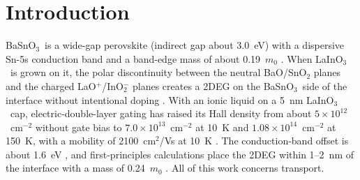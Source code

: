 \documentclass[11pt]{article}
\newcommand{\LIO}{\texorpdfstring{LaInO$_3$}{LaInO3}}
\newcommand{\BSO}{\texorpdfstring{BaSnO$_3$}{BaSnO3}}
\begin{document}
\begin{abstract}
With all positive charge at the interface the Fermi level reaches the \LIO\ conduction band near $1.1\times10^{14}$~cm$^{-2}$ (compensated). If the gate charge sits instead on the surface of a 5~nm \LIO\ cap, as in electrolyte gating, cap states start to fill after only $2.0$--$3.1\times10^{13}$~cm$^{-2}$ of added density, so that purely electrostatic gating through such a cap stays far below the measured $0.7$--$1.1\times10^{14}$~cm$^{-2}$; in this model they require most of the added positive charge to sit close to the interface, or a larger band offset. With three polar LO modes (Fr\"ohlich constants summing to 1.3), the $2\to1$ lifetime of electrons excited from subband 1 is 32--79~fs. The asymmetric well has an intrinsic second-order susceptibility; for a 30~meV linewidth Coulomb screening reduces it by factors of 2--9, to 37--139~nm$^2$/V per interface. Over the literature ranges of seven material parameters, the acceptor density dominates the uncertainty of $E_{21}$, the collective absorption is about twice as robust, and at $10^{14}$~cm$^{-2}$ the Fermi level lies within 0.2~eV of the cap conduction band in 82\% of the parameter sets.
\end{abstract}

\section{Introduction}
\BSO\ is a wide-gap perovskite (indirect gap about 3.0~eV) with a dispersive Sn-5s conduction band and a band-edge mass of about 0.19~$m_0$ \cite{Niedermeier2017,Aggoune2022}. When \LIO\ is grown on it, the polar discontinuity between the neutral BaO/SnO$_2$ planes and the charged LaO$^+$/InO$_2^-$ planes creates a 2DEG on the \BSO\ side of the interface without intentional doping \cite{Kim2019LIO,Aggoune2021}. With an ionic liquid on a 5~nm \LIO\ cap, electric-double-layer gating \cite{Lee2024LIO,Ueno2008} has raised its Hall density from about $5\times10^{12}$~cm$^{-2}$ without gate bias to $7.0\times10^{13}$~cm$^{-2}$ at 10~K and $1.08\times10^{14}$~cm$^{-2}$ at 150~K, with a mobility of 2100~cm$^2$/Vs at 10~K \cite{Lee2024LIO}. The conduction-band offset is about 1.6~eV \cite{Kim2019LIO,Lee2024LIO}, and first-principles calculations place the 2DEG within 1--2~nm of the interface with a mass of 0.24~$m_0$ \cite{Aggoune2021}. All of this work concerns transport.
\end{document}
